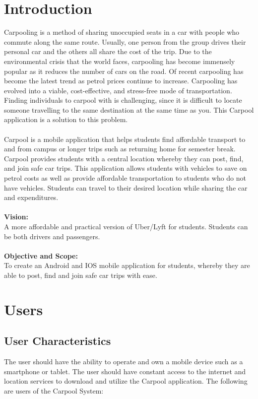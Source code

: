 \documentclass[hidelinks, 12pt, a4paper]{article}
\begin{document}
\section{Introduction}
Carpooling is a method of sharing unoccupied seats in a car with people who commute along the same route. Usually, one person from the group drives their personal car and the others all share the cost of the trip. Due to the environmental crisis that the world faces, carpooling has become immensely popular as it reduces the number of cars on the road. Of recent carpooling has become the latest trend as petrol prices continue to increase. Carpooling has evolved into a viable, cost-effective, and stress-free mode of transportation. Finding individuals to carpool with is challenging, since it is difficult to locate someone travelling to the same destination at the same time as you. This Carpool application is a solution to this problem. \\ \\
Carpool is a mobile application that helps students find affordable transport to and from campus or longer trips such as returning home for semester break. Carpool provides students with a central location whereby they can post, find, and join safe car trips. This application allows students with vehicles to save on petrol costs as well as provide affordable transportation to students who do not have vehicles. Students can travel to their desired location while sharing the car and expenditures.\\ \\
\textbf{Vision:}\\
A more affordable and practical version of Uber/Lyft for students. Students can be both drivers and passengers.\\ \\
\textbf{Objective and Scope:} \\
To create an Android and IOS mobile application for students, whereby they are able to post, find and join safe car trips with ease.

\newpage
\section{Users}

\subsection{User Characteristics}
    
The user should have the ability to operate and own a mobile device such as a smartphone or tablet. The user should have constant access to the internet and location services to download and utilize the Carpool application. The following are users of the Carpool System:\\
    
\end{document}
